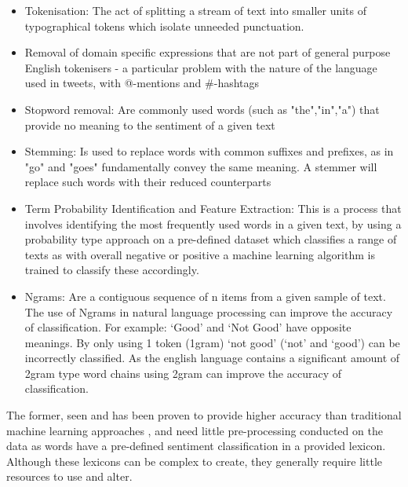 \documentclass[oneside, 12pt]{article}
\begin{document}
			\begin{itemize}
				\item Tokenisation: The act of splitting a stream of text into smaller units of typographical tokens which isolate unneeded punctuation.
				\item Removal of domain specific expressions that are not part of general purpose English tokenisers - a particular problem with the nature of the language used in tweets, with @-mentions and \#-hashtags
				\item Stopword removal: Are commonly used words (such as "the","in","a") that provide no meaning to the sentiment of a given text
				\item Stemming: Is used to replace words with common suffixes and prefixes, as in "go" and "goes" fundamentally convey the same meaning. A stemmer will replace such words with their reduced counterparts
				\item Term Probability Identification and Feature Extraction: This is a process that involves identifying the most frequently used words in a given text, by using a probability type approach on a pre-defined dataset which classifies a range of texts as with overall negative or positive a machine learning algorithm is trained to classify these accordingly.
				\item Ngrams: Are a contiguous sequence of n items from a given sample of text. The use of Ngrams in natural language processing can improve the accuracy of classification. For example: ‘Good’ and ‘Not Good’ have opposite meanings. By only using 1 token (1gram) ‘not good’ (‘not’ and ‘good’) can be incorrectly classified. As the english language contains a significant amount of 2gram type word chains using 2gram can improve the accuracy of classification.
			\end{itemize}
			
			The former, seen and has been proven to provide higher accuracy than traditional machine learning approaches \cite{LexiconSocSent}, and need little pre-processing conducted on the data as words have a pre-defined sentiment classification in a provided lexicon. Although these lexicons can be complex to create, they generally require little resources to use and alter.
			
\end{document}
